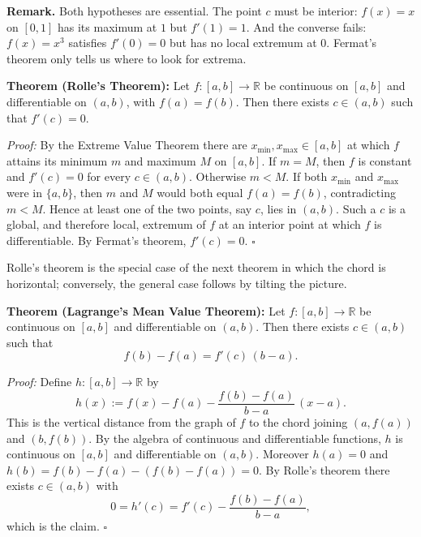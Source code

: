\documentclass[a4paper,11pt,abstracton]{scrartcl}
\newcommand{\RR}{\mathbb{R}}
\theoremstyle{dotlessP}
\theoremstyle{dotlessS}
\theoremstyle{remark}
\theoremstyle{definition}
\begin{document}
\begin{remark_box}
\textbf{Remark.} Both hypotheses are essential. The point $c$ must be interior: $f(x)=x$ on $[0,1]$ has its maximum at $1$ but $f'(1)=1$. And the converse fails: $f(x)=x^3$ satisfies $f'(0)=0$ but has no local extremum at $0$. Fermat's theorem only tells us where to look for extrema.
\end{remark_box}

\begin{problem_box}
\textbf{Theorem (Rolle's Theorem):}
Let $f:[a,b]\to\RR$ be continuous on $[a,b]$ and differentiable on $(a,b)$, with $f(a)=f(b)$. Then there exists $c\in(a,b)$ such that $f'(c)=0$.
\end{problem_box}

\begin{claim_box}
\textit{Proof:}
By the Extreme Value Theorem there are $x_{\min},x_{\max}\in[a,b]$ at which $f$ attains its minimum $m$ and maximum $M$ on $[a,b]$. If $m=M$, then $f$ is constant and $f'(c)=0$ for every $c\in(a,b)$. Otherwise $m<M$. If both $x_{\min}$ and $x_{\max}$ were in $\{a,b\}$, then $m$ and $M$ would both equal $f(a)=f(b)$, contradicting $m<M$. Hence at least one of the two points, say $c$, lies in $(a,b)$. Such a $c$ is a global, and therefore local, extremum of $f$ at an interior point at which $f$ is differentiable. By Fermat's theorem, $f'(c)=0$.
\hfill$\square$
\end{claim_box}

Rolle's theorem is the special case of the next theorem in which the chord is horizontal; conversely, the general case follows by tilting the picture.

\begin{problem_box}
\textbf{Theorem (Lagrange's Mean Value Theorem):}
Let $f:[a,b]\to\RR$ be continuous on $[a,b]$ and differentiable on $(a,b)$. Then there exists $c\in(a,b)$ such that
\[
    \boxed{f(b)-f(a)=f'(c)\,(b-a).}
\]
\end{problem_box}

\begin{claim_box}
\textit{Proof:}
Define $h:[a,b]\to\RR$ by
\[
    h(x):=f(x)-f(a)-\frac{f(b)-f(a)}{b-a}\,(x-a).
\]
This is the vertical distance from the graph of $f$ to the chord joining $(a,f(a))$ and $(b,f(b))$. By the algebra of continuous and differentiable functions, $h$ is continuous on $[a,b]$ and differentiable on $(a,b)$. Moreover $h(a)=0$ and $h(b)=f(b)-f(a)-(f(b)-f(a))=0$. By Rolle's theorem there exists $c\in(a,b)$ with
\[
    0=h'(c)=f'(c)-\frac{f(b)-f(a)}{b-a},
\]
which is the claim.
\hfill$\square$
\end{claim_box}
\end{document}
